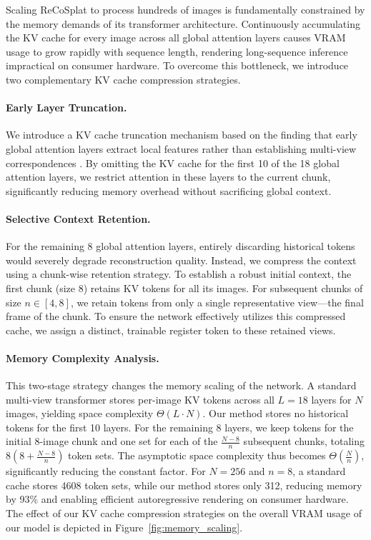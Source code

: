 \documentclass[runningheads]{llncs}
\begin{document}
Scaling ReCoSplat to process hundreds of images is fundamentally constrained by the memory demands of its transformer architecture. 
Continuously accumulating the KV cache for every image across all global attention layers causes VRAM usage to grow rapidly with sequence length, rendering long-sequence inference impractical on consumer hardware. 
To overcome this bottleneck, we introduce two complementary KV cache compression strategies.

\vspace{-2mm} \paragraph{\textbf{Early Layer Truncation.}}
We introduce a KV cache truncation mechanism based on the finding that early global attention layers extract local features rather than establishing multi-view correspondences \cite{sun2025avggtrethinkingglobalattention}.
By omitting the KV cache for the first 10 of the 18 global attention layers, we restrict attention in these layers to the current chunk, significantly reducing memory overhead without sacrificing global context.

\vspace{-2mm} \paragraph{\textbf{Selective Context Retention.}}
For the remaining 8 global attention layers, entirely discarding historical tokens would severely degrade reconstruction quality. Instead, we compress the context using a chunk-wise retention strategy. To establish a robust initial context, the first chunk (size 8) retains KV tokens for all its images. For subsequent chunks of size $n \in [4, 8]$, we retain tokens from only a single representative view—the final frame of the chunk. To ensure the network effectively utilizes this compressed cache, we assign a distinct, trainable register token to these retained views.

\vspace{-2mm} \paragraph{\textbf{Memory Complexity Analysis.}}
This two-stage strategy changes the memory scaling of the network. 
A standard multi-view transformer stores per-image KV tokens across all $L=18$ layers for $N$ images, yielding space complexity $\Theta(L \cdot N)$. 
Our method stores no historical tokens for the first 10 layers. 
For the remaining 8 layers, we keep tokens for the initial 8-image chunk and one set for each of the $\frac{N-8}{n}$ subsequent chunks, totaling $8\!\left(8 + \frac{N-8}{n}\right)$ token sets. 
The asymptotic space complexity thus becomes $\Theta(\frac{N}{n})$, significantly reducing the constant factor. 
For $N=256$ and $n=8$, a standard cache stores 4608 token sets, while our method stores only 312, reducing memory by 93\% and enabling efficient autoregressive rendering on consumer hardware.
The effect of our KV cache compression strategies on the overall VRAM usage of our model is depicted in Figure~\ref{fig:memory_scaling}.
\end{document}
